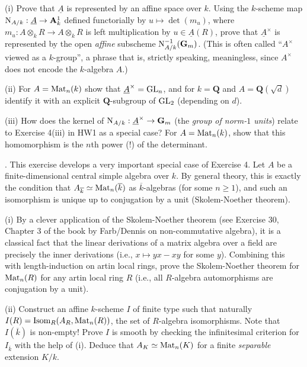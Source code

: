 \documentclass[10pt]{amsart}
\begin{document}
(i) Prove that $\underline{A}$ is represented by an affine space over $k$.
Using the $k$-scheme map ${\rm{N}}_{A/k}:
\underline{A} \rightarrow \mathbf{A}^1_k$ defined functorially by
$u \mapsto \det(m_u)$, where $m_u:A \otimes_k R \rightarrow A \otimes_k R$ is left multiplication
by $u \in \underline{A}(R)$, prove that
$\underline{A}^{\times}$ is represented by the open {\em affine} subscheme 
${\rm{N}}_{A/k}^{-1}(\mathbf{G}_m)$.  (This is often called
``$A^{\times}$ viewed as a $k$-group'', a phrase that
is, strictly speaking, meaningless,  since $A^{\times}$ does not encode the $k$-algebra $A$.) 

(ii) For $A = {\rm{Mat}}_n(k)$ show that
$\underline{A}^{\times} = {\rm{GL}}_n$, and for $k = \mathbf{Q}$ and $A = \mathbf{Q}(\sqrt{d})$ identify it with
an explicit $\mathbf{Q}$-subgroup of ${\rm{GL}}_2$ (depending on $d$).

(iii)  How does the kernel of ${\rm{N}}_{A/k}:\underline{A}^{\times} \rightarrow
\mathbf{G}_m$ (the {\em group of norm-$1$ units}) relate to Exercise 4(iii) in HW1 as a special case?
For $A = {\rm{Mat}}_n(k)$, show that this homomorphism is the $n$th power (!)
of the determinant.  

\medskip{}.  This exercise develops a very important special case of Exercise 4.
Let $A$ be a finite-dimensional central simple algebra over $k$.  By general theory, this is exactly
the condition that $A_{\overline{k}} \simeq {\rm{Mat}}_n(\overline{k})$ 
as $\overline{k}$-algebras (for some $n \ge 1$), and such an isomorphism is unique up to 
conjugation by a unit (Skolem-Noether theorem).  

(i) By a clever application of the Skolem-Noether theorem (see Exercise 30, Chapter 3 of the
book by Farb/Dennis on non-commutative algebra), it is a classical fact that
the linear derivations of a matrix algebra over a field are  precisely the inner derivations
(i.e., $x \mapsto yx - xy$ for some $y$).  Combining this with length-induction on artin local rings, prove
the Skolem-Noether theorem for ${\rm{Mat}}_n(R)$ for any artin local ring $R$
(i.e., all $R$-algebra automorphisms are conjugation by a unit).  

(ii) Construct an affine $k$-scheme $I$ of finite type such that naturally 
$I(R) = {\rm{Isom}}_R(A_R, {\rm{Mat}}_n(R))$, the set of $R$-algebra isomorphisms.
Note that $I(\overline{k})$ is non-empty!  
Prove $I$ is smooth by checking the infinitesimal criterion for $I_{\overline{k}}$ with the help of (i).
Deduce that $A_K \simeq {\rm{Mat}}_n(K)$ for a finite {\em separable} extension $K/k$.  
\end{document}

